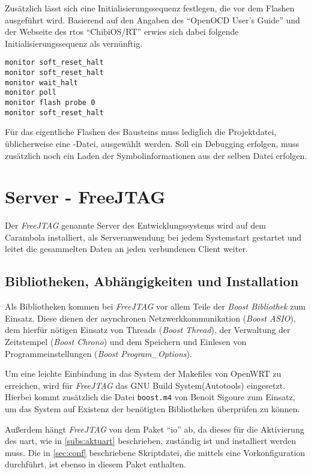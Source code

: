 Zusätzlich lässt sich eine Initialisierungssequenz festlegen, die vor dem
Flashen ausgeführt wird. Basierend auf den Angaben des "`OpenOCD User's
Guide"'\cite{OOCD} und der Webseite des \gls{rtos} "`ChibiOS/RT"'\cite{CHIB}
erwies sich dabei folgende Initialisierungssequenz als vernünftig.
\begin{lstlisting}
monitor soft_reset_halt
monitor soft_reset_halt
monitor wait_halt
monitor poll
monitor flash probe 0
monitor soft_reset_halt
\end{lstlisting}
Für das eigentliche Flashen des Bausteins muss lediglich die Projektdatei,
üblicherweise eine -Datei, ausgewählt werden. Soll ein
Debugging erfolgen, muss zusätzlich noch ein Laden der Symbolinformationen aus
der selben Datei erfolgen.
\section{Server - FreeJTAG}
Der \emph{FreeJTAG} genannte Server des Entwicklungssystems wird auf dem
Carambola installiert, als Serveranwendung bei jedem Systemstart gestartet und leitet die
gesammelten Daten an jeden verbundenen Client weiter.

\subsection{Bibliotheken, Abhängigkeiten und Installation}
Als Bibliotheken kommen bei \emph{FreeJTAG} vor allem Teile der \emph{Boost Bibliothek}
zum Einsatz. Diese dienen der asynchronen Netzwerkkommunikation (\emph{Boost
ASIO}), dem hierfür nötigen Einsatz von Threads (\emph{Boost Thread}), der
Verwaltung der Zeitstempel (\emph{Boost Chrono}) und dem Speichern und
Einlesen von Programmeinstellungen (\emph{Boost Program\_Options}).

Um eine leichte Einbindung in das System der Makefiles von OpenWRT zu erreichen,
wird für \emph{FreeJTAG} das GNU Build System(Autotools) eingesetzt. Hierbei
kommt zusätzlich die Datei \texttt{boost.m4} von Benoit Sigoure\cite{GITH01} zum
Einsatz, um das System auf Existenz der benötigten Bibliotheken überprüfen zu
können.

Außerdem hängt \emph{FreeJTAG} von dem Paket "`io"' ab, da dieses für die Aktivierung
des \gls{uart}, wie in \autoref{subs:aktuart} beschrieben, zuständig ist und
installiert werden muss. Die in \autoref{sec:conf} beschriebene Skriptdatei,
die mittels  eine Vorkonfiguration durchführt, ist
ebenso in diesem Paket enthalten.

